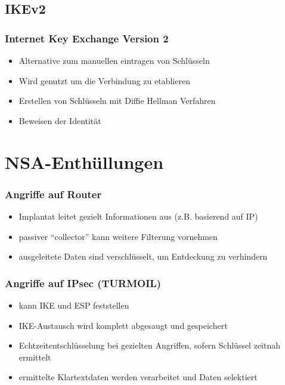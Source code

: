 \documentclass[t]{beamer}
\begin{document}
\subsection*{IKEv2}
\begin{frame}
	\frametitle{Internet Key Exchange Version 2}
	\begin{itemize}
		\vfill
		\item Alternative zum manuellen eintragen von Schlüsseln
		\vfill
		\item Wird genutzt um die Verbindung zu etablieren
		\vfill
		\item Erstellen von Schlüsseln mit Diffie Hellman Verfahren
		\vfill
		\item Beweisen der Identität
		\vfill
	\end{itemize}
\end{frame}

\section{NSA-Enthüllungen}
\begin{frame}
	\frametitle{Angriffe auf Router}
	\begin{itemize}
		\vfill
		\item Implantat leitet gezielt Informationen aus (z.B. basierend auf IP)
		\vfill
		\item passiver "`collector"' kann weitere Filterung vornehmen
		\vfill
		\item ausgeleitete Daten sind verschlüsselt, um Entdeckung zu verhindern
		\vfill
	\end{itemize}
\end{frame}


{

}

\begin{frame}
	\frametitle{Angriffe auf IPsec (TURMOIL)}
	\begin{itemize}
		\vfill
		\item kann IKE und ESP feststellen
		\vfill
		\item IKE-Austausch wird komplett abgesaugt und gespeichert
		\vfill
		\item Echtzeitentschlüsselung bei gezielten Angriffen, sofern Schlüssel zeitnah ermittelt
		\vfill
		\item ermittelte Klartextdaten werden verarbeitet und Daten selektiert
		\vfill
	\end{itemize}
\end{frame}
\end{document}
